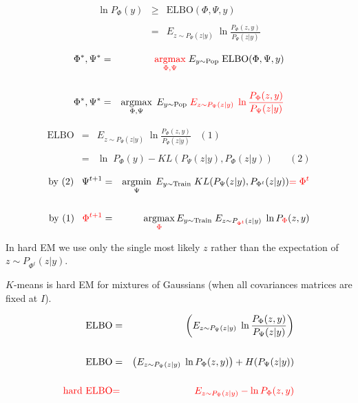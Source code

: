 {

\begin{eqnarray*}
\ln P_\Phi(y) & \geq & \mathrm{ELBO}(\Phi,\Psi,y) \\
\\
& = & E_{z \sim P_\Psi(z|y)}\;\ln\frac{P_\Phi(z,y)}{P_\Psi(z|y)}
\end{eqnarray*}

\begin{eqnarray*}
\Phi^*, \Psi^* & = & {\color{red} \operatorname*{argmax}_{\Phi,\Psi}}\; E_{y \sim \mathrm{Pop}}\;\mathrm{ELBO}(\Phi,\Psi,y) \\
\\
\Phi^*, \Psi^* & = & \operatorname*{argmax}_{\Phi,\Psi}\;E_{y \sim \mathrm{Pop}}\;{\color{red} E_{z \sim P_\Psi(z|y)}\;\ln \frac{P_\Phi(z,y)}{P_\Psi(z|y)}}
\end{eqnarray*}


\begin{eqnarray*}
\mathrm{ELBO} & = & E_{z \sim P_\Psi(z|y)}\; \ln \frac{P_\Phi(z,y)}{P_\Psi(z|y)}\;\;\;(1) \\
 \\      
  & = &\ln\;P_{\Phi}(y) - KL(P_\Psi(z|y),P_{\Phi}(z|y))\;\;\;\;\;\;(2)
  \end{eqnarray*}

\vfill
\begin{eqnarray*}
\mbox{by (2)}\;\;\;\Psi^{t+1} & = & \operatorname*{argmin}_\Psi \;E_{y \sim \mathrm{Train}} \; KL(P_{\Psi}(z|y),P_{\Phi^t}(z|y)) {\color{red} = \Phi^t} \\
\\
\mbox{by (1)}\;\;\;{\color{red} \Phi^{t+1}} & = & \operatorname*{argmax}_{\color{red} \Phi} E_{y \sim \mathrm{Train}} \;E_{z \sim P_{\color{red} {\Phi^t}}(z|y)}\; \ln P_{\color{red} \Phi}(z,y)
\end{eqnarray*}

\vfill
In hard EM we use only the single most likely $z$ rather than the expectation of $z \sim P_{\Phi^t}(z|y)$.

\vfill
$K$-means is hard EM for mixtures of Gaussians (when all covariances matrices are fixed at $I$).

\begin{eqnarray*}
\mathrm{ELBO} & = & \left(E_{z\sim P_\Psi(z|y)} \;\ln \frac{P_\Phi(z,y)}{P_\Psi(z|y)}\right) \\
\\
\mbox{ELBO} & = & \left(E_{z\sim P_\Psi(z|y)} \;\ln P_\Phi(z,y)\right) + H(P_\Psi(z|y)) \\
\\
{\color{red} \mbox{hard ELBO}} & {\color{red}  =} & {\color{red}  E_{z \sim P_\Psi(z|y)} - \ln P_\Phi(z,y)}
\end{eqnarray*}

}
